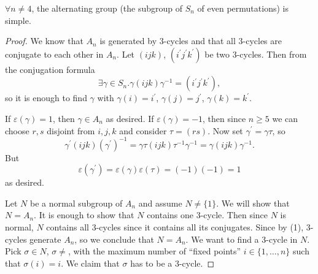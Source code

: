 \begin{theorem}
$\forall n \neq 4$, the alternating group (the subgroup of $S_n$ of even
permutations) is simple.
\end{theorem}
\begin{proof}
We know that $A_n$ is generated by 3-cycles and that all 3-cycles are
conjugate to each other in $A_n$. Let $(ijk)$, $(i^\prime j^\prime
k^\prime)$ be two 3-cycles. Then from the conjugation formula
$$
\exists \gamma \in S_n . \gamma(ijk)\gamma^{-1} = (i^\prime j^\prime k^\prime),
$$
so it is enough to find $\gamma$ with $\gamma(i) = i^\prime$,
$\gamma(j) = j^\prime$, $\gamma(k) = k^\prime$.

If $\varepsilon(\gamma) =  1$, then $\gamma \in A_n$ as desired.
If $\varepsilon(\gamma) = -1$, then since $n \geq 5$ we can choose $r,
s$ disjoint from $i,j,k$ and consider $\tau = (rs)$. Now set
$\gamma^\prime = \gamma \tau$, so
$$
  \gamma^\prime (ijk) (\gamma^\prime)^{-1}
= \gamma \tau (ijk) \tau^{-1} \gamma^{-1}
= \gamma (ijk) \gamma^{-1}.
$$
But
$$
  \varepsilon(\gamma^\prime)
= \varepsilon(\gamma)\varepsilon(\tau) = (-1)(-1) = 1
$$
as desired.

Let $N$ be a normal subgroup of $A_n$ and assume $N \neq \{ 1 \}$. We
will show that $N = A_n$. It is enough to show that $N$ contains one
3-cycle.
Then since $N$ is normal, $N$ contains all 3-cycles since it contains
all its conjugates. Since by (1), 3-cycles generate $A_n$, so we
conclude that $N = A_n$. We want to find a 3-cycle in $N$. Pick
$\sigma \in N$, $\sigma \neq $, with the maximum number of ``fixed
points'' $i \in \{ 1, \dots, n \}$ such that $\sigma(i) = i$. We claim
that $\sigma$ has to be a 3-cycle.


\end{proof}
